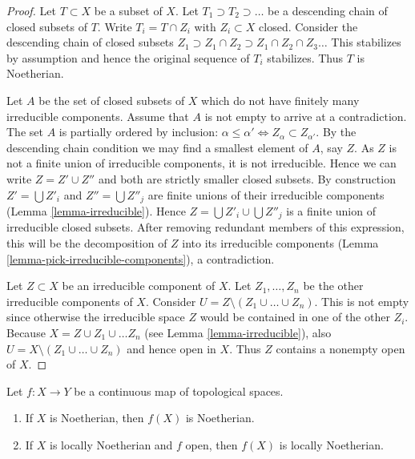 \begin{proof}
Let $T \subset X$ be a subset of $X$.
Let $T_1 \supset T_2 \supset \ldots$
be a descending chain of closed subsets of $T$.
Write $T_i =  T \cap Z_i$ with $Z_i \subset X$ closed.
Consider the descending chain of closed subsets
$Z_1 \supset Z_1\cap Z_2 \supset Z_1 \cap Z_2 \cap Z_3 \ldots$
This stabilizes by assumption and hence the original sequence
of $T_i$ stabilizes. Thus $T$ is Noetherian.

\medskip\noindent
Let $A$ be the set of closed subsets of $X$ which do not
have finitely many irreducible components. Assume that
$A$ is not empty to arrive at a contradiction.
The set $A$ is partially ordered by inclusion: $\alpha \leq \alpha'
\Leftrightarrow Z_{\alpha} \subset Z_{\alpha'}$.
By the descending chain condition we may find a
smallest element of $A$, say $Z$. As $Z$ is not a finite
union of irreducible components, it is not irreducible.
Hence we can write $Z = Z' \cup Z''$ and both are strictly smaller
closed subsets. By construction $Z' = \bigcup Z'_i$ and
$Z'' = \bigcup Z''_j$ are finite unions of their irreducible
components (Lemma \ref{lemma-irreducible}).
Hence $Z = \bigcup Z'_i \cup \bigcup Z''_j$ is
a finite union of irreducible closed subsets.
After removing redundant members of this expression,
this will be the decomposition of $Z$ into its irreducible
components (Lemma \ref{lemma-pick-irreducible-components}), a contradiction.

\medskip\noindent
Let $Z \subset X$ be an irreducible component of $X$.
Let $Z_1, \ldots, Z_n$ be the other irreducible components
of $X$. Consider $U = Z \setminus (Z_1\cup\ldots\cup Z_n)$.
This is not empty since otherwise the irreducible space
$Z$ would be contained in one of the other $Z_i$.
Because $X = Z \cup Z_1 \cup \ldots Z_n$ (see Lemma \ref{lemma-irreducible}),
also $U = X \setminus (Z_1\cup\ldots\cup Z_n)$
and hence open in $X$. Thus $Z$ contains a nonempty
open of $X$.
\end{proof}

\begin{lemma}
\label{lemma-image-Noetherian}
Let $f : X \to Y$ be a continuous map of topological spaces.
\begin{enumerate}
\item If $X$ is Noetherian, then $f(X)$ is Noetherian.
\item If $X$ is locally Noetherian and $f$ open, then $f(X)$ is
locally Noetherian.
\end{enumerate}
\end{lemma}

